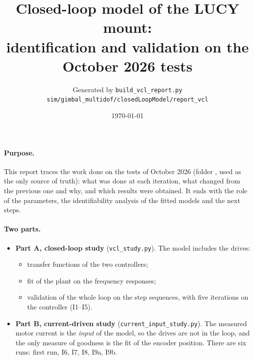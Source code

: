\documentclass[10pt,a4paper]{article}
\title{Closed-loop model of the LUCY mount:\\ identification and validation on the October 2026 tests}
\author{Generated by \texttt{build\_vcl\_report.py}\\ \small\texttt{sim/gimbal\_multidof/closedLoopModel/report\_vcl}}
\date{\today}
\numberwithin{equation}{section}
\begin{document}
\maketitle

\paragraph{Purpose.} This report traces the work done on the tests of October 2026 (folder , used as the only source of truth): what was done at each iteration, what changed from the previous one and why, and which results were obtained. It ends with the role of the parameters, the identifiability analysis of the fitted models and the next steps.

\paragraph{Two parts.}
\begin{itemize}
\item \textbf{Part A, closed-loop study} (\texttt{vcl\_study.py}). The model includes the drives:
  \begin{itemize}
  \item transfer functions of the two controllers;
  \item fit of the plant on the frequency responses;
  \item validation of the whole loop on the step sequences, with five iterations on the controller (I1--I5).
  \end{itemize}
\item \textbf{Part B, current-driven study} (\texttt{current\_input\_study.py}). The measured motor current is the \emph{input} of the model, so the drives are not in the loop, and the only measure of goodness is the fit of the encoder position. There are six runs: first run, I6, I7, I8, I9a, I9b.
\end{itemize}
\end{document}
